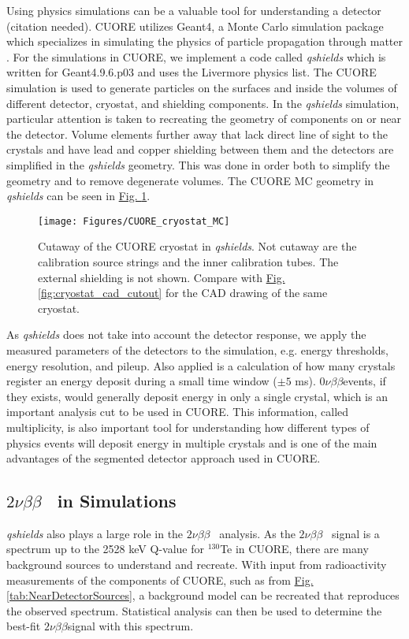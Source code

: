 \documentclass[12pt,a4paper]{article}
\newcommand{\zeronubb}{$0\nu \beta \beta$}
\newcommand{\twonubb}{$2\nu \beta \beta$}
\begin{document}
Using physics simulations can be a valuable tool for understanding a detector (\color{blue}citation needed\color{black}).  CUORE utilizes Geant4, a Monte Carlo simulation package which specializes in simulating the physics of particle propagation through matter \cite{Allison:2006ve}\cite{Agostinelli:2002hh}. For the simulations in CUORE, we implement a code called \textit{qshields} which is written for Geant4.9.6.p03 and uses the Livermore physics list. The CUORE simulation is used to generate particles on the surfaces and inside the volumes of different detector, cryostat, and shielding components. In the \textit{qshields} simulation, particular attention is taken to recreating the geometry of components on or near the detector. Volume elements further away that lack direct line of sight to the crystals and have lead and copper shielding between them and the detectors are simplified in the \textit{qshields} geometry. This was done in order both to simplify the geometry and to remove degenerate volumes. The CUORE MC geometry in \textit{qshields} can be seen in \hyperref[fig:cuorecryostatmc]{Fig. \ref*{fig:cuorecryostatmc}}.

\begin{figure}[htbp]
\centering
\texttt{[image: Figures/CUORE\_cryostat\_MC]}
\caption{Cutaway of the CUORE cryostat in \textit{qshields}. Not cutaway are the calibration source strings and the inner calibration tubes. The external shielding is not shown. Compare with \hyperref[fig:cryostat_cad_cutout]{Fig. \ref*{fig:cryostat_cad_cutout}} for the CAD drawing of the same cryostat.}
\label{fig:cuorecryostatmc}
\end{figure}

As \textit{qshields} does not take into account the detector response, we apply the measured parameters of the detectors to the simulation, e.g. energy thresholds, energy resolution, and pileup. Also applied is a calculation of how many crystals register an energy deposit during a small time window ($\pm5$ ms). \zeronubb events, if they exists, would generally deposit energy in only a single crystal, which is an important analysis cut to be used in CUORE. This information, called multiplicity, is also important tool for understanding how different types of physics events will deposit energy in multiple crystals and is one of the main advantages of the segmented detector approach used in CUORE.

\subsection{\twonubb~ in Simulations}
\textit{qshields} also plays a large role in the \twonubb~ analysis. As the \twonubb~ signal is a spectrum up to the 2528 keV Q-value for $^{130}$Te in CUORE, there are many background sources to understand and recreate. With input from radioactivity measurements of the components of CUORE, such as from \hyperref[tab:NearDetectorSources]{Fig. \ref*{tab:NearDetectorSources}}, a background model can be recreated that reproduces the observed spectrum. Statistical analysis can then be used to determine the best-fit \twonubb signal with this spectrum.
  
\end{document}
